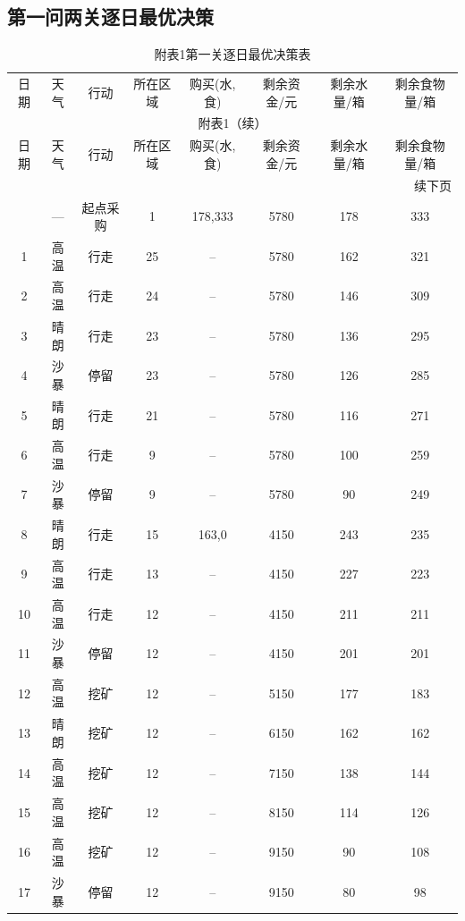 \documentclass{cumcmthesis}
\numberwithin{equation}{section}
\numberwithin{figure}{section}
\numberwithin{table}{section}
\begin{document}
\begin{appendices}
\section{第一问两关逐日最优决策}
{
\begin{longtable}{cccccccc}
\captionsetup{justification=raggedright,singlelinecheck=off}
     \caption*{附表1\quad 第一关逐日最优决策表}
      \label{tab:q1_daily1} \\
    \toprule
    日期 & 天气 & 行动 & 所在区域 & 购买(水,食) & 剩余资金/元 & 剩余水量/箱 & 剩余食物量/箱 \\
    \midrule
    \endfirsthead
    \multicolumn{8}{c}{附表1（续）} \\
    \toprule
    日期 & 天气 & 行动 & 所在区域 & 购买(水,食) & 剩余资金/元 & 剩余水量/箱 & 剩余食物量/箱 \\
    \midrule
    \endhead
    \midrule
    \multicolumn{8}{r}{续下页} \\
    \endfoot
    \bottomrule
    \endlastfoot
    0 & — & 起点采购 & 1 & 178,333 & 5780 & 178 & 333 \\
    1 & 高温 & 行走 & 25 & -- & 5780 & 162 & 321 \\
    2 & 高温 & 行走 & 24 & -- & 5780 & 146 & 309 \\
    3 & 晴朗 & 行走 & 23 & -- & 5780 & 136 & 295 \\
    4 & 沙暴 & 停留 & 23 & -- & 5780 & 126 & 285 \\
    5 & 晴朗 & 行走 & 21 & -- & 5780 & 116 & 271 \\
    6 & 高温 & 行走 & 9 & -- & 5780 & 100 & 259 \\
    7 & 沙暴 & 停留 & 9 & -- & 5780 & 90 & 249 \\
    8 & 晴朗 & 行走 & 15 & 163,0 & 4150 & 243 & 235 \\
    9 & 高温 & 行走 & 13 & -- & 4150 & 227 & 223 \\
    10 & 高温 & 行走 & 12 & -- & 4150 & 211 & 211 \\
    11 & 沙暴 & 停留 & 12 & -- & 4150 & 201 & 201 \\
    12 & 高温 & 挖矿 & 12 & -- & 5150 & 177 & 183 \\
    13 & 晴朗 & 挖矿 & 12 & -- & 6150 & 162 & 162 \\
    14 & 高温 & 挖矿 & 12 & -- & 7150 & 138 & 144 \\
    15 & 高温 & 挖矿 & 12 & -- & 8150 & 114 & 126 \\
    16 & 高温 & 挖矿 & 12 & -- & 9150 & 90 & 108 \\
    17 & 沙暴 & 停留 & 12 & -- & 9150 & 80 & 98 \\

\end{longtable}}
\end{appendices}
\end{document}
